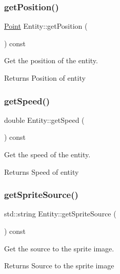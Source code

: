 \subsubsection{\texorpdfstring{get\+Position()}{getPosition()}}
{\footnotesize\ttfamily \hyperlink{structPoint}{Point} Entity\+::get\+Position (\begin{DoxyParamCaption}{ }\end{DoxyParamCaption}) const}



Get the position of the entity. 

\begin{DoxyReturn}{Returns}
Position of entity 
\end{DoxyReturn}
\mbox{\label{classEntity_a7cf65c6f73d2a17e59a26344c8ffb999}} 
\subsubsection{\texorpdfstring{get\+Speed()}{getSpeed()}}
{\footnotesize\ttfamily double Entity\+::get\+Speed (\begin{DoxyParamCaption}{ }\end{DoxyParamCaption}) const}



Get the speed of the entity. 

\begin{DoxyReturn}{Returns}
Speed of entity 
\end{DoxyReturn}
\mbox{\label{classEntity_a0d10637b4a1e31e139fcf992227d4ef8}} 
\subsubsection{\texorpdfstring{get\+Sprite\+Source()}{getSpriteSource()}}
{\footnotesize\ttfamily std\+::string Entity\+::get\+Sprite\+Source (\begin{DoxyParamCaption}{ }\end{DoxyParamCaption}) const}



Get the source to the sprite image. 

\begin{DoxyReturn}{Returns}
Source to the sprite image 
\end{DoxyReturn}
\mbox{\label{classEntity_a002be2c6f13d59bff1806ef8815478d5}} 
